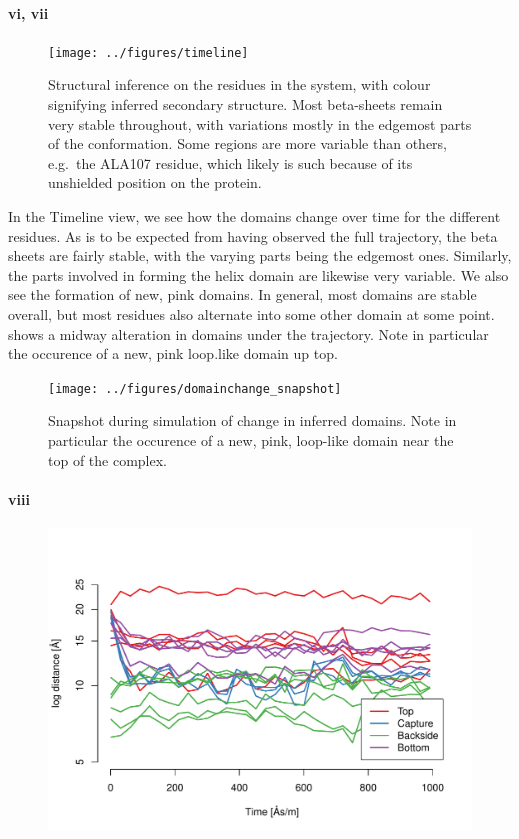 \documentclass[10pt]{article}\usepackage[]{graphicx}\usepackage[]{color}
\makeatletter
\def\maxwidth{ %
  \ifdim\Gin@nat@width>\linewidth
    \linewidth
  \else
    \Gin@nat@width
  \fi
}
\theoremstyle{plain}
\makeatother
\begin{document}
\paragraph*{vi, vii}
\begin{figure}[H]
	\centering
	\texttt{[image: ../figures/timeline]}
	\caption{Structural inference on the residues in the system, with colour signifying inferred secondary structure. Most beta-sheets remain very stable throughout, with variations mostly in the edgemost parts of the conformation. Some regions are more variable than others, e.g.\ the ALA107 residue, which likely is such because of its unshielded position on the protein.}
	\label{fig:timeline}
\end{figure}
\begin{multicols*}{2}
	In the Timeline view, we see how the domains change over time for the different residues. As is to be expected from having observed the full trajectory, the beta sheets are fairly stable, with the varying parts being the edgemost ones. Similarly, the parts involved in forming the helix domain are likewise very variable. We also see the formation of new, pink domains. In general, most domains are stable overall, but most residues also alternate into some other domain at some point.  shows a midway alteration in domains under the trajectory. Note in particular the occurence of a new, pink loop.like domain up top.
		
	\begin{figure}[H]
		\centering
		\texttt{[image: ../figures/domainchange\_snapshot]}
		\caption{Snapshot during simulation of change in inferred domains. Note in particular the occurence of a new, pink, loop-like domain near the top of the complex.}
		\label{fig:domchange}
	\end{figure}
	
	\paragraph*{viii}
\begin{Schunk}
\begin{figure}[H]

{\centering \includegraphics[width=\maxwidth]{figure/twocolumn-dists-1} 

}
\end{figure}
\end{Schunk}
\end{multicols*}
\end{document}
